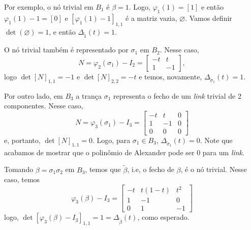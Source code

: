 	Por exemplo, o nó trivial em $B_1$ é $\beta = 1$. Logo, $\varphi_1(1) = [1]$ e então 
	$\varphi_1(1) - 1 = [0]$ e $[\varphi_1(1) - 1]_{1,1}$ é a matriz vazia, $\varnothing$. 
	Vamos definir $\det(\varnothing) = 1$, e então $\Delta_{\widetilde{1}}(t) = 1$.
	
	\par\vspace{0.3cm} O nó trivial também é representado por $\sigma_1$ em $B_2$. Nesse caso, 
	\begin{equation*}
	N = \varphi_2(\sigma_1) - I_2 = \begin{bmatrix}
	-t & t \\
	1 & -1
	\end{bmatrix},
	\end{equation*}
	logo $\det[N]_{1,1} = -1$ e $\det[N]_{2,2} = -t$ e temos, novamente, $\Delta_{\widetilde{\sigma}_1}(t) = 1$.
	
	\par\vspace{0.3cm} Por outro lado, em $B_3$ a trança $\sigma_1$ representa o fecho de um 
	\textit{link} trivial de 2 componentes. Nesse caso, 
	\begin{equation*}
    	N = \varphi_3(\sigma_1) - I_3 = \begin{bmatrix}
    	-t & t & 0 \\
    	1 & -1 & 0 \\
    	0 & 0 & 0
    	\end{bmatrix}
	\end{equation*}
	e, portanto, $\det[N]_{1,1} = 0$. Logo, para $\sigma_1\in B_3$, $\Delta_{\widetilde{\sigma}_1}(t) = 0$. 
	Note que acabamos de mostrar que o polinômio de Alexander pode ser $0$ para um \textit{link}.
	
	\par\vspace{0.3cm} Tomando $\beta = \sigma_1\sigma_2$ em $B_3$, temos que $\widetilde{\beta}$, 
	i.e, o fecho de $\beta$, é o nó trivial. Nesse caso, temos
	\begin{equation*}
    	\varphi_3(\beta) - I_3 = \begin{bmatrix}
    	-t & t(1-t) & t^2 \\
    	1 & -1 & 0 \\
    	0 & 1 & -1
    	\end{bmatrix}
	\end{equation*}
	logo, $\det[\varphi_3(\beta)-I_3]_{1,1} = 1 = \Delta_{\widetilde{\beta}}(t)$, como esperado.
	
